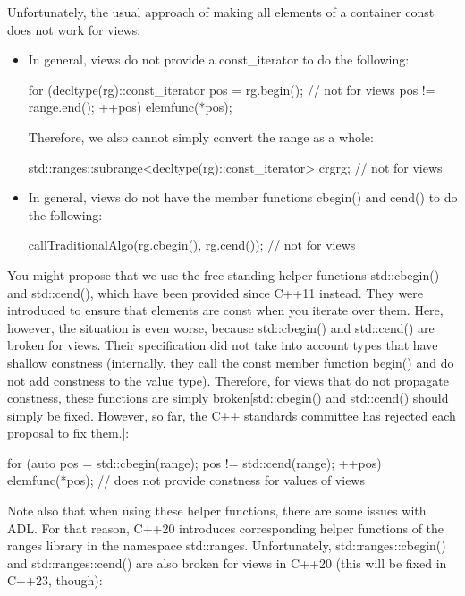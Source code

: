 Unfortunately, the usual approach of making all elements of a container const does not work for views:

\begin{itemize}
\item
In general, views do not provide a const\_iterator to do the following:

\begin{cpp}
for (decltype(rg)::const_iterator pos = rg.begin(); // not for views
pos != range.end();
++pos) {
	elemfunc(*pos);
}
\end{cpp}

Therefore, we also cannot simply convert the range as a whole:

\begin{cpp}
std::ranges::subrange<decltype(rg)::const_iterator> crg{rg}; // not for views
\end{cpp}

\item
In general, views do not have the member functions cbegin() and cend() to do the following:

\begin{cpp}
callTraditionalAlgo(rg.cbegin(), rg.cend()); // not for views
\end{cpp}
\end{itemize}

You might propose that we use the free-standing helper functions std::cbegin() and std::cend(), which have been provided since C++11 instead. They were introduced to ensure that elements are const when you iterate over them. Here, however, the situation is even worse, because std::cbegin() and std::cend() are broken for views. Their specification did not take into account types that have shallow constness (internally, they call the const member function begin() and do not add constness to the value type). Therefore, for views that do not propagate constness, these functions are simply broken[std::cbegin() and std::cend() should simply be fixed. However, so far, the C++ standards committee has rejected each proposal to fix them.]:

\begin{cpp}
for (auto pos = std::cbegin(range); pos != std::cend(range); ++pos) {
	elemfunc(*pos); // does not provide constness for values of views
}
\end{cpp}

Note also that when using these helper functions, there are some issues with ADL. For that reason, C++20 introduces corresponding helper functions of the ranges library in the namespace std::ranges. Unfortunately, std::ranges::cbegin() and std::ranges::cend() are also broken for views in C++20 (this will be fixed in C++23, though):

